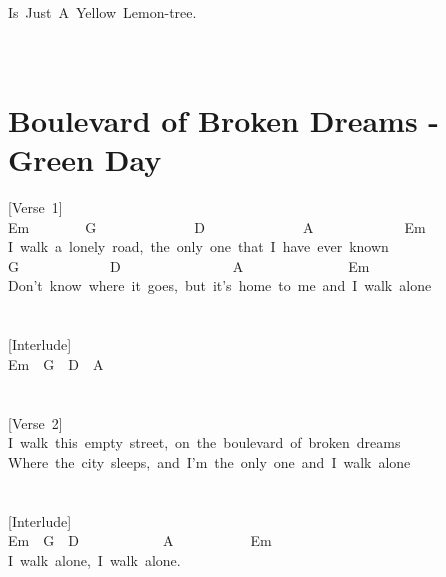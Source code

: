\documentclass[]{book}
\let\stdsection\section
\renewcommand\section{\clearpage\stdsection}
\begin{document}
Is~Just~A~Yellow~Lemon-tree.\\
~\\
~\\

\hypertarget{boulevard-of-broken-dreams---green-day}{%
\section{Boulevard of Broken Dreams - Green Day}\label{boulevard-of-broken-dreams---green-day}}

{[}Verse~1{]}\\
Em~~~~~~~~G~~~~~~~~~~~~~~D~~~~~~~~~~~~~~A~~~~~~~~~~~~~Em\\
I~walk~a~lonely~road,~the~only~one~that~I~have~ever~known\\
\hspace*{0.333em}\hspace*{0.333em}\hspace*{0.333em}\hspace*{0.333em}\hspace*{0.333em}\hspace*{0.333em}\hspace*{0.333em}\hspace*{0.333em}\hspace*{0.333em}\hspace*{0.333em}\hspace*{0.333em}\hspace*{0.333em}G~~~~~~~~~~~~~D~~~~~~~~~~~~~~~~A~~~~~~~~~~~~~~~Em\\
Don't~know~where~it~goes,~but~it's~home~to~me~and~I~walk~alone\\
~\\
~\\
{[}Interlude{]}\\
Em~~G~~D~~A\\
~\\
~\\
{[}Verse~2{]}\\
I~walk~this~empty~street,~on~the~boulevard~of~broken~dreams\\
Where~the~city~sleeps,~and~I'm~the~only~one~and~I~walk~alone\\
~\\
~\\
{[}Interlude{]}\\
Em~~G~~D~~~~~~~~~~~~A~~~~~~~~~~~Em\\
\hspace*{0.333em}\hspace*{0.333em}\hspace*{0.333em}\hspace*{0.333em}\hspace*{0.333em}\hspace*{0.333em}\hspace*{0.333em}\hspace*{0.333em}\hspace*{0.333em}\hspace*{0.333em}\hspace*{0.333em}\hspace*{0.333em}I~walk~alone,~I~walk~alone.\\
\end{document}
